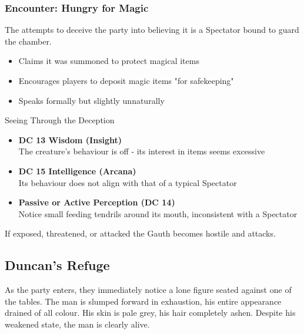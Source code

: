 \subsubsection*{Encounter: Hungry for Magic}
{\entryfont The \hyperref[monster:Gauth]{} attempts to deceive the party into believing it is a Spectator bound to guard the chamber.
\begin{itemize}
	\item Claims it was summoned to protect magical items
	\item Encourages players to deposit magic items "for safekeeping"
	\item Speaks formally but slightly unnaturally
\end{itemize}
Seeing Through the Deception
\begin{itemize}\renewcommand\labelitemi{\textbf{\textbullet}}
	\item \textbf{DC 13 Wisdom (Insight)}\\The creature's behaviour is off - its interest in items seems excessive
	\item \textbf{DC 15 Intelligence (Arcana)}\\Its behaviour does not align with that of a typical Spectator
	\item \textbf{Passive or Active Perception (DC 14)}\\Notice small feeding tendrils around its mouth, inconsistent with a Spectator
\end{itemize}
If exposed, threatened, or attacked the Gauth becomes hostile and attacks.}
\subsection*{ Duncan's Refuge}
{\entryfont As the party enters, they immediately notice a lone figure seated against one of the tables. The man is slumped forward in exhaustion, his entire appearance drained of all colour. His skin is pale grey, his hair completely ashen. Despite his weakened state, the man is clearly alive.}
